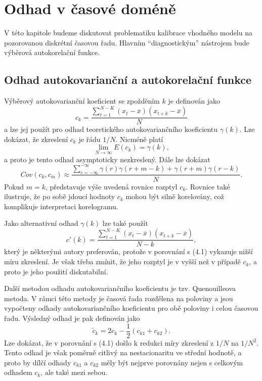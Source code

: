 \chapter{Odhad v časové doméně}

V této kapitole budeme diskutovat problematiku kalibrace vhodného modelu na pozorovanou diskrétní časovou řadu. Hlavním ``diagnostickým'' nástrojem bude výběrová autokorelační funkce.

\section{Odhad autokovarianční a autokorelační funkce}

Výběrový autokovarianční koeficient se zpožděním $k$ je definován jako
\begin{equation}
c_k = \frac{\sum_{t = 1}^{N-K} (x_t - \overline{x})(x_{t+k} - \overline{x})}{N}
\end{equation}
a lze jej použít pro odhad teoretického autokovariančního koeficientu $\gamma(k)$. Lze dokázat, že zkreslení $c_k$ je řádu $1/N$. Nicméně platí
\begin{equation}
\lim_{N \rightarrow \infty} E(c_k) = \gamma(k),
\end{equation}
a proto je tento odhad asymptoticky nezkreslený. Dále lze dokázat
\begin{equation}
Cov(c_k, c_m) \approx \frac{\sum_{r= -\infty}^{-\infty}\gamma(r)\gamma(r+m-k) + \gamma(r+m)\gamma(r-k)}{N}.
\end{equation}
Pokud $m = k$, představuje výše uvedená rovnice rozptyl $c_k$. Rovnice také ilustruje, že po sobě jdoucí hodnoty $c_k$ mohou být silně korelovány, což komplikuje interpretaci korelogramu.

Jako alternativní odhad $\gamma(k)$ lze také použít
\begin{equation}
c'(k) = \frac{\sum_{t = 1}^{N-K} (x_t - \overline{x})(x_{t+k} - \overline{x})}{N - k},
\end{equation}
který je některými autory preferován, protože v porovnání s (4.1) vykazuje nižší míru zkreslení. Je však třeba zmínit, že jeho rozptyl je v vyšší než v případě $c_k$, a proto je jeho použití diskutabilní.

Další metodou odhadu autokovariančního koeficientu je tzv. Quenouilleova metoda. V rámci této metody je časová řada rozdělena na poloviny a jsou vypočteny odhady autokovariančního koeficientu pro obě poloviny i celou časovou řadu. Výsledný odhad je pak definován jako
\begin{equation}
\tilde{c}_k = 2 c_k - \frac{1}{2}(c_{k1} + c_{k2}).
\end{equation}
Lze dokázat, že v porovnání s (4.1) došlo k redukci míry zkreslení z $1/N$ na $1/N^2$. Tento odhad je však poměrně citlivý na nestacionaritu ve střední hodnotě, a proto by dílčí odhady $c_{k1}$ a $c_{k2}$ měly být nejprve porovnány nejen s celkovým odhadem $c_k$, ale také mezi sebou.

